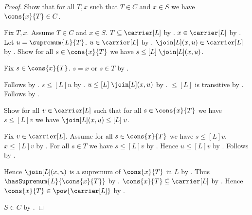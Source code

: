 \begin{proof}
    Show that for all $T,x$ such that $T\in C$ and $x\in S$ we have
        $\cons{x}{T}\in C$.
    \begin{subproof}
        Fix $T,x$.
        Assume $T\in C$ and $x\in S$.
        $T\subseteq\carrier[L]$ by .
        $x\in\carrier[L]$ by .
        Let $u=\supremum{L}{T}$.
        $u\in\carrier[L]$ by .
        $\join[L](x,u)\in\carrier[L]$ by
            .
        Show for all $s\in\cons{x}{T}$ we have
            $s\mathrel{\leq[L]}\join[L](x,u)$.
        \begin{subproof}
            Fix $s\in\cons{x}{T}$.
            $s=x$ or $s\in T$ by .
            \begin{byCase}
                Follows by
                    .
                $s\mathrel{\leq[L]}u$ by .
                $u\mathrel{\leq[L]}\join[L](x,u)$ by
                    .
                $\leq[L]$ is transitive by
                    .
                Follows by .
            \end{byCase}
        \end{subproof}
        Show for all $v\in\carrier[L]$ such that
            for all $s\in\cons{x}{T}$ we have $s\mathrel{\leq[L]}v$
            we have $\join[L](x,u)\mathrel{\leq[L]}v$.
        \begin{subproof}
            Fix $v\in\carrier[L]$.
            Assume for all $s\in\cons{x}{T}$ we have
                $s\mathrel{\leq[L]}v$.
            $x\mathrel{\leq[L]}v$ by .
            For all $s\in T$ we have $s\mathrel{\leq[L]}v$ by
                .
            Hence $u\mathrel{\leq[L]}v$ by .
            Follows by
                .
        \end{subproof}
        Hence $\join[L](x,u)$ is a supremum of $\cons{x}{T}$ in $L$ by
            .
        Thus $\hasSupremum{L}{\cons{x}{T}}$ by
            .
        $\cons{x}{T}\subseteq\carrier[L]$ by
            .
        Hence $\cons{x}{T}\in\pow{\carrier[L]}$ by
            .
    \end{subproof}
    $S\in C$ by .
\end{proof}

